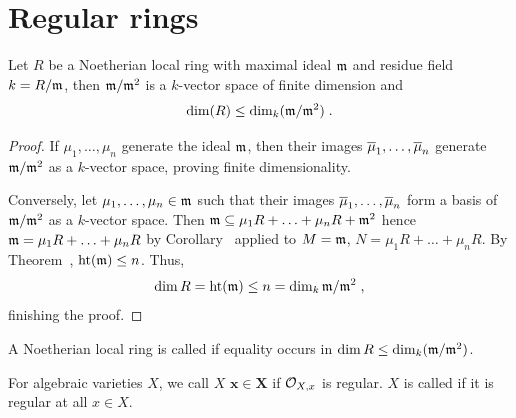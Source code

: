 \documentclass[a4paper,parskip=half,numbers=enddot, DIV=12]{scrreprt}
\begin{document}
\section{Regular rings}
\begin{prop}
    Let $R$ be a Noetherian local ring with maximal ideal $\mathfrak{m}$ and residue field $k=R/\mathfrak{m}$, then $\mathfrak{m}/\mathfrak{m}^2$ is a $k$-vector space of finite dimension and 
    \begin{align*}
    	\dim(R) \leq \dim_k(\mathfrak{m}/\mathfrak{m}^2)\;.
    \end{align*}
\end{prop}
\begin{proof}
    If $\mu_1,\ldots,\mu_n$ generate the ideal $\mathfrak{m}$, then their images $\overline{\mu}_1,\ldots,\overline{\mu}_n$ generate $\mathfrak{m}/\mathfrak{m}^2$ as a $k$-vector space, proving finite dimensionality. 
    
    Conversely, let $\mu_1,\ldots,\mu_n\in\mathfrak{m}$ such that their images $\overline{\mu}_1,\ldots,\overline{\mu}_n$ form a basis of $\mathfrak{m}/\mathfrak{m}^2$ as a $k$-vector space. Then $\mathfrak{m} \subseteq \mu_1R+\ldots+\mu_nR+\mathfrak{m}^2$ hence $\mathfrak{m} = \mu_1R+\ldots+\mu_nR$ by Corollary~ applied to $M = \mathfrak{m}$, $N = \mu_1R+\ldots+\mu_nR$. By Theorem~, $\operatorname{ht}(\mathfrak{m}) \leq n$. Thus,
    \begin{align*}
    	\dim R = \operatorname{ht}(\mathfrak{m}) \leq n = \dim_k \mathfrak{m}/\mathfrak{m}^2\;,
    \end{align*}
    finishing the proof.
\end{proof}
\begin{defi}[Regularity]
	\begin{alphanumerate}
		\item A Noetherian local ring is called  if equality occurs in $\dim R \leq\dim_k(\mathfrak{m}/\mathfrak{m}^2)$. 
		\item For algebraic varieties $X$, we call $X$  $\boldsymbol{x\in X}$ if $\mathcal{O}_{X,x}$ is regular. $X$ is called  if it is regular at all $x\in X$.
	\end{alphanumerate}
\end{defi}
\end{document}
